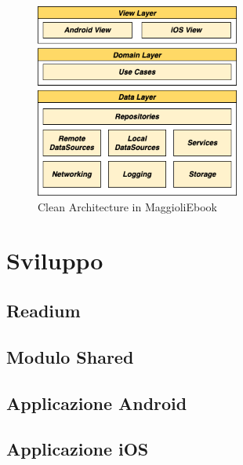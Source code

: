 \begin{figure}[H]
    \centering
    \includegraphics[width=0.6\textwidth]{img/clean-architecture.png}
    \caption{Clean Architecture in MaggioliEbook}
\end{figure}


\section{Sviluppo}

\subsection{Readium}

\subsection{Modulo Shared}

\subsection{Applicazione Android}

\subsection{Applicazione iOS}
